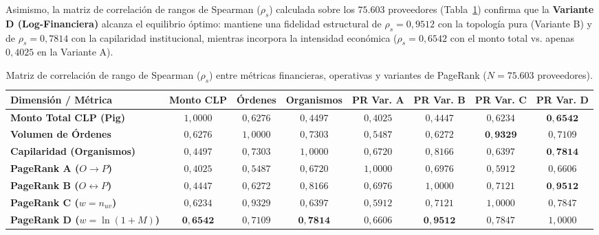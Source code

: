 \documentclass[11pt,a4paper]{article}
\begin{document}
Asimismo, la matriz de correlación de rangos de Spearman ($\rho_s$) calculada sobre los $75.603$ proveedores (Tabla~\ref{tab:correlaciones}) confirma que la \textbf{Variante D (Log-Financiera)} alcanza el equilibrio óptimo: mantiene una fidelidad estructural de $\rho_s = 0,9512$ con la topología pura (Variante B) y de $\rho_s = 0,7814$ con la capilaridad institucional, mientras incorpora la intensidad económica ($\rho_s = 0,6542$ con el monto total vs. apenas $0,4025$ en la Variante A).

\begin{table}[H]
\centering
\caption{Matriz de correlación de rango de Spearman ($\rho_s$) entre métricas financieras, operativas y variantes de PageRank ($N = 75.603$ proveedores).}
\label{tab:correlaciones}
\small
\begin{tabular}{lccccccc}
\toprule
\textbf{Dimensión / Métrica} & \textbf{Monto CLP} & \textbf{Órdenes} & \textbf{Organismos} & \textbf{PR Var. A} & \textbf{PR Var. B} & \textbf{PR Var. C} & \textbf{PR Var. D} \\
\midrule
\textbf{Monto Total CLP (Pig)} & $1,0000$ & $0,6276$ & $0,4497$ & $0,4025$ & $0,4447$ & $0,6234$ & $\mathbf{0,6542}$ \\
\textbf{Volumen de Órdenes} & $0,6276$ & $1,0000$ & $0,7303$ & $0,5487$ & $0,6272$ & $\mathbf{0,9329}$ & $0,7109$ \\
\textbf{Capilaridad (Organismos)} & $0,4497$ & $0,7303$ & $1,0000$ & $0,6720$ & $0,8166$ & $0,6397$ & $\mathbf{0,7814}$ \\
\textbf{PageRank A ($O \to P$)} & $0,4025$ & $0,5487$ & $0,6720$ & $1,0000$ & $0,6976$ & $0,5912$ & $0,6606$ \\
\textbf{PageRank B ($O \leftrightarrow P$)} & $0,4447$ & $0,6272$ & $0,8166$ & $0,6976$ & $1,0000$ & $0,7121$ & $\mathbf{0,9512}$ \\
\textbf{PageRank C ($w = n_{uv}$)} & $0,6234$ & $0,9329$ & $0,6397$ & $0,5912$ & $0,7121$ & $1,0000$ & $0,7847$ \\
\textbf{PageRank D ($w = \ln(1+M)$)} & $\mathbf{0,6542}$ & $0,7109$ & $\mathbf{0,7814}$ & $0,6606$ & $\mathbf{0,9512}$ & $0,7847$ & $1,0000$ \\
\bottomrule
\end{tabular}
\end{table}

\end{document}
